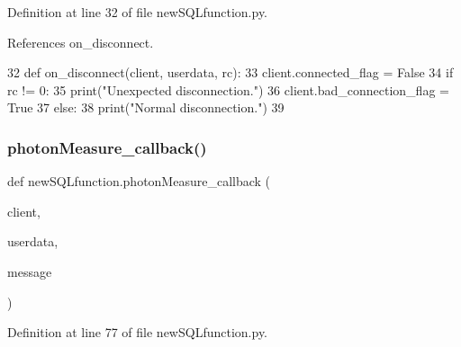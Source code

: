 Definition at line 32 of file new\+S\+Q\+Lfunction.\+py.



References on\+\_\+disconnect.


\begin{DoxyCode}
32 \textcolor{keyword}{def }on_disconnect(client, userdata, rc):
33     client.connected\_flag = \textcolor{keyword}{False}
34     \textcolor{keywordflow}{if} rc != 0:
35         print(\textcolor{stringliteral}{"Unexpected disconnection."})
36         client.bad\_connection\_flag = \textcolor{keyword}{True}
37     \textcolor{keywordflow}{else}:
38         print(\textcolor{stringliteral}{"Normal disconnection."})
39 
\end{DoxyCode}
\mbox{\label{namespacenew_s_q_lfunction_afe7ab223f1c9a368d97f6fe0a6565c92}} 
\subsubsection{photon\+Measure\+\_\+callback()}
{\footnotesize\ttfamily def new\+S\+Q\+Lfunction.\+photon\+Measure\+\_\+callback (\begin{DoxyParamCaption}\item[{}]{client,  }\item[{}]{userdata,  }\item[{}]{message }\end{DoxyParamCaption})}



Definition at line 77 of file new\+S\+Q\+Lfunction.\+py.


